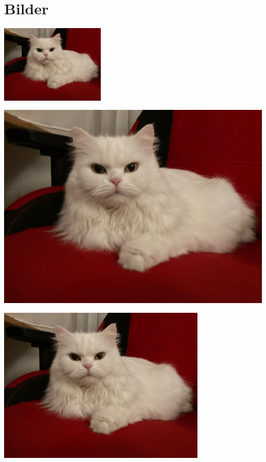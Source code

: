 \documentclass[12pt,ngerman,parskip=half]{scrreprt} %
\begin{document}
\chapter{Bilder}

\includegraphics[width=5cm]{Katze2.jpg}

\includegraphics[width=\textwidth]{Katze2.jpg}

\begin{center}
\includegraphics[width=0.75\textwidth]{Katze2.jpg}
\end{center}
\end{document}
